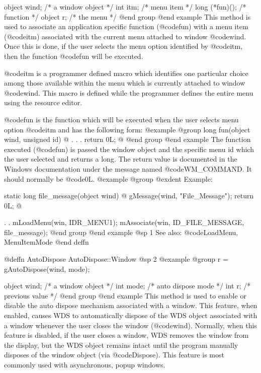 object  wind;   /*  a window object     */
int     itm;    /*  menu item           */
long    (*fun)();  /*  function         */
object   r;        /*  the menu         */
@end group
@end example
This method is used to associate an application specific function
(@code{fun}) with a menu item (@code{itm}) associated with the current
menu attached to window @code{wind}.  Once this is done, if the user selects
the menu option identified by @code{itm}, then the function @code{fun}
will be executed.

@code{itm} is a programmer defined macro which identifies one particular
choice among those available within the menu which is currently attached
to window @code{wind}.  This macro is defined while the programmer defines
the entire menu using the resource editor.

@code{fun} is the function which will be executed when the user selects
menu option @code{itm} and has the following form:
@example
@group
long    fun(object wind, unsigned id)
@{
        .
        .
        .
        return 0L;
@}
@end group
@end example
The function executed (@code{fun}) is passed the window object and
the specific menu id which the user selected and
returns a long.  The return value is documented in the Windows documentation
under the message named @code{WM_COMMAND}.  It should normally be @code{0L}.
@example
@group
@exdent Example:

static  long    file_message(object wind)
@{
        gMessage(wind, "File_Message");
        return 0L;
@}

        .
        .
        mLoadMenu(win, IDR_MENU1);
        mAssociate(win, ID_FILE_MESSAGE, file_message);
@end group
@end example
@sp 1
See also:  @code{LoadMenu, MenuItemMode}
@end deffn











@deffn {AutoDispose} AutoDispose::Window
@sp 2
@example
@group
r = gAutoDispose(wind, mode);

object   wind;     /*  a window object    */
int      mode;     /*  auto dispose mode  */
int      r;        /*  previous value     */
@end group
@end example
This method is used to enable or disable the auto dispose mechanism
associated with a window.  This feature, when enabled, causes WDS to
automatically dispose of the WDS object associated with a window
whenever the user closes the window (@code{wind}).  Normally, when
this feature is disabled, if the user closes a window, WDS removes
the window from the display, but the WDS object remains intact until
the program manually disposes of the window object (via @code{Dispose}).
This feature is most commonly used with asynchronous, popup windows.

